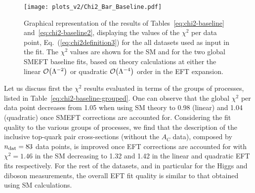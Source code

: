 

\begin{figure}[t]
  \begin{center}
    \texttt{[image: plots\_v2/Chi2\_Bar\_Baseline.pdf]}
    \caption{\small Graphical representation of the results of Tables~\ref{eq:chi2-baseline}
      and~\ref{eq:chi2-baseline2},
      displaying the values of the $\chi^2$ per data point, Eq.~(\ref{eq:chi2definition3})
      for the all datasets used as input in the fit.
     The $\chi^2$ values are shown  for the SM and for the two global SMEFT
      baseline fits, based on theory calculations at either the linear $\mathcal{O}\lp \Lambda^{-2}\rp$ or
       quadratic $\mathcal{O}\lp \Lambda^{-4}\rp$ order in the EFT expansion.
     \label{fig:chi2_barplot} }
  \end{center}
\end{figure}

Let us discuss first the $\chi^2$ results evaluated in terms of the groups
of processes, listed in Table~\ref{eq:chi2-baseline-grouped}.
%
One can observe that the global $\chi^2$ per data point decreases from 1.05 when using
SM theory to 0.98 (linear) and 1.04 (quadratic) once SMEFT corrections
are accounted for.
%
Considering the fit quality to the various groups of processes, we find
that the description of the inclusive top-quark pair
cross-sections (without the $A_C$ data),
composed by $n_{\rm dat}=83$ data points, is improved once EFT corrections
are accounted for with $\chi^2=1.46$ in the SM decreasing
to 1.32 and 1.42 in the linear and quadratic EFT fits
respectively.
%
For the rest of the datasets, and in particular for the Higgs and diboson
measurements, the overall EFT fit quality is similar to that
obtained using SM calculations.


